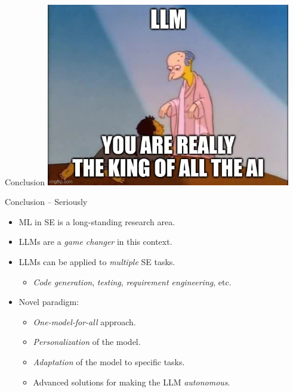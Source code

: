 \documentclass[presentation, 10pt]{beamer}\mode<presentation>{\usetheme{AMSBolognaFC}}
\begin{document}
\begin{frame}{Conclusion}
	\centering
\includegraphics[width=0.8\textwidth]{img/king-of-all-the-king.png}
\end{frame}
\begin{frame}{Conclusion -- Seriously}
\begin{itemize}
	\item ML in SE is a long-standing research area.
	\item LLMs are a \emph{game changer} in this context.
	\item LLMs can be applied to \emph{multiple} SE tasks.
	\begin{itemize}
		\item \emph{Code generation}, \emph{testing}, \emph{requirement engineering}, etc.
	\end{itemize}
	\item Novel paradigm:
	\begin{itemize}
		\item \emph{One-model-for-all} approach.
		\item \emph{Personalization} of the model.
		\item \emph{Adaptation} of the model to specific tasks.
		\item Advanced solutions for making the LLM \emph{autonomous}.
	\end{itemize}
\end{itemize}
\end{frame}

\frame{\titlepage}

\section*{\refname}

\begin{frame}{\refname}
	\tiny
	\printbibliography
\end{frame}

\end{document}
